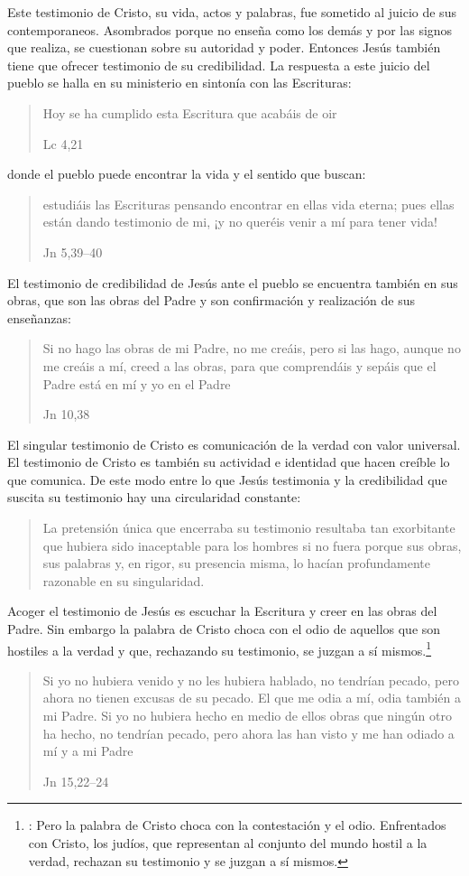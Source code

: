Este testimonio de Cristo, su vida, actos y palabras, fue sometido al juicio de
sus contemporaneos. Asombrados porque no enseña como los demás y por las signos
que realiza, se cuestionan sobre su autoridad y poder. Entonces Jesús también
tiene que ofrecer testimonio de su credibilidad. La respuesta a este juicio del
pueblo se halla en su ministerio en sintonía con las Escrituras: \blockquote[Lc
4,21]{Hoy se ha cumplido esta Escritura que acabáis de oir}; donde el pueblo
puede encontrar la vida y el sentido que buscan: \blockquote[Jn
5,39--40]{estudiáis las Escrituras pensando encontrar en ellas vida eterna; pues
  ellas están dando testimonio de mi, ¡y no queréis venir a mí para tener
  vida!}. El testimonio de credibilidad de Jesús ante el pueblo se encuentra
también en sus obras, que son las obras del Padre y son confirmación y
realización de sus enseñanzas: \blockquote[Jn 10,38]{Si no hago las obras de mi
  Padre, no me creáis, pero si las hago, aunque no me creáis a mí, creed a las
  obras, para que comprendáis y sepáis que el Padre está en mí y yo en el
  Padre}.

El singular testimonio de Cristo es comunicación de la verdad con valor
universal. El testimonio de Cristo es también su actividad e identidad que hacen
creíble lo que comunica. De este modo entre lo que Jesús testimonia y la
credibilidad que suscita su testimonio hay una circularidad constante:

\blockquote[{\cite[124]{prades2015testimonio}}]{La pretensión única que
  encerraba su testimonio resultaba tan exorbitante que hubiera sido inaceptable
  para los hombres si no fuera porque sus obras, sus palabras y, en rigor, su
  presencia misma, lo hacían profundamente razonable en su singularidad.}

Acoger el testimonio de Jesús es escuchar la Escritura y creer en las obras del
Padre. Sin embargo la palabra de Cristo choca con el odio de aquellos que son
hostiles a la verdad y que, rechazando su testimonio, se juzgan a sí
mismos.\footnote{\cite[1530]{latourelle2000testimonio}: Pero la palabra de
  Cristo choca con la contestación y el odio. Enfrentados con Cristo, los
  judíos, que representan al conjunto del mundo hostil a la verdad, rechazan su
  testimonio y se juzgan a sí mismos.}

\blockquote[Jn 15,22--24]{Si yo no hubiera venido y no les hubiera hablado, no
  tendrían pecado, pero ahora no tienen excusas de su pecado. El que me odia a
  mí, odia también a mi Padre. Si yo no hubiera hecho en medio de ellos obras
  que ningún otro ha hecho, no tendrían pecado, pero ahora las han visto y me
  han odiado a mí y a mi Padre}

